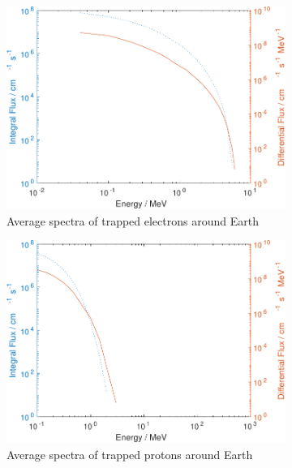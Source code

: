 \begin{figure}[htb]
     \centering
     \begin{subfigure}[b]{0.49\textwidth}
         \centering
         \includegraphics[width=\textwidth]{Media/E_Electron_Flux}
         \caption{Average spectra of trapped electrons around Earth}
         \label{fig:trappedelectronsEarth}
     \end{subfigure}
     \hfill
     \begin{subfigure}[b]{0.49\textwidth}
         \centering
         \includegraphics[width=\textwidth]{Media/E_Proton_Flux}
         \caption{Average spectra of trapped protons around Earth}
         \label{fig:trappedprotonsEarth}
     \end{subfigure}
     \hfill
     \begin{subfigure}[b]{0.49\textwidth}

\end{subfigure}
\end{figure}
